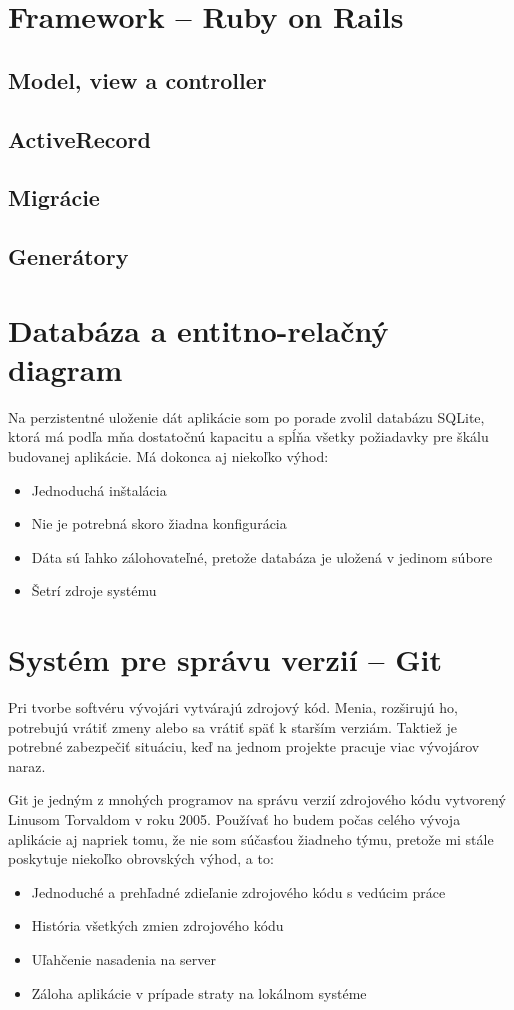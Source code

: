 \section{Framework -- Ruby on Rails}

\subsection{Model, view a controller}
\subsection{ActiveRecord}
\subsection{Migrácie}
\subsection{Generátory}

\section{Databáza a entitno-relačný diagram}

Na perzistentné uloženie dát aplikácie som po porade zvolil databázu SQLite, ktorá má podľa mňa dostatočnú kapacitu a spĺňa všetky požiadavky pre škálu budovanej aplikácie. Má dokonca aj niekoľko výhod:

\begin{itemize}
    \item Jednoduchá inštalácia
    \item Nie je potrebná skoro žiadna konfigurácia
    \item Dáta sú ľahko zálohovateľné, pretože databáza je uložená v jedinom súbore
    \item Šetrí zdroje systému
\end{itemize}

\section{Systém pre správu verzií -- Git}

Pri tvorbe softvéru vývojári vytvárajú zdrojový kód. Menia, rozširujú ho, potrebujú vrátiť zmeny alebo sa vrátiť späť k starším verziám. Taktiež je potrebné zabezpečiť situáciu, keď na jednom projekte pracuje viac vývojárov naraz. \citep{otte2009version} 

Git je jedným z mnohých programov na správu verzií zdrojového kódu vytvorený Linusom Torvaldom v roku 2005. Používať ho budem počas celého vývoja aplikácie aj napriek tomu, že nie som súčasťou žiadneho týmu, pretože mi stále poskytuje niekoľko obrovských výhod, a to: 

\begin{itemize}
    \item Jednoduché a prehľadné zdieľanie zdrojového kódu s vedúcim práce
    \item História všetkých zmien zdrojového kódu
    \item Uľahčenie nasadenia na server
    \item Záloha aplikácie v prípade straty na lokálnom systéme
\end{itemize}